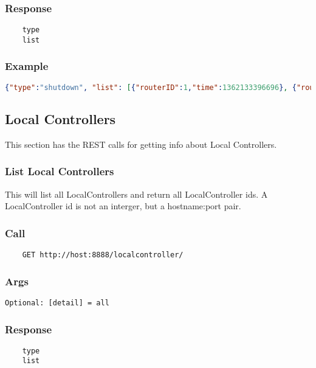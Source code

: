 \subsubsection*{Response}
\begin{verbatim}
	type
	list
\end{verbatim}

\subsubsection*{Example}
\begin{lstlisting}[language=json]
{"type":"shutdown", "list": [{"routerID":1,"time":1362133396696}, {"routerID":2,"time":1362133396696}, {"routerID":3,"time":1362133396696}]}
\end{lstlisting}

\subsection{Local Controllers}

This section has the REST calls for getting info about Local Controllers.


\hr
\subsubsection{List Local Controllers}
This will list all LocalControllers and return all LocalController ids. A LocalController id is not an interger, but a hostname:port pair.
\subsubsection*{Call}
\begin{verbatim}
	GET http://host:8888/localcontroller/
\end{verbatim}

\subsubsection*{Args}
\begin{verbatim}
Optional: [detail] = all
\end{verbatim}

\subsubsection*{Response}
\begin{verbatim}
	type
	list
\end{verbatim}

